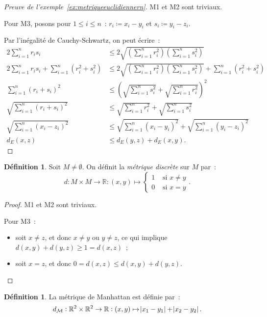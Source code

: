 \documentclass{report}
\theoremstyle{definition}
\newtheorem{déf}[thm]{Définition}
\theoremstyle{remark}
\newcommand{\R}{\mathbb R}
\begin{document}
		\begin{proof}[Preuve de l'exemple~\ref{ex:metriqueeuclidiennern}] M1 et M2 sont triviaux.

		Pour M3, posons pour $1 \leq i \leq n$~: $r_i \coloneqq x_i - y_i$ et $s_i \coloneqq y_i - z_i$.

		Par l'inégalité de Cauchy-Schwartz, on peut écrire~:
		\begin{align*}
			2\sum_{i=1}^nr_is_i &\leq 2\sqrt {\left(\sum_{i=1}^nr_i^2\right)\left(\sum_{i=1}^ns_i^2\right)} \\
			2\sum_{i=1}^nr_is_i + \sum_{i=1}^n(r_i^2+s_i^2) &\leq 2\sqrt{\left(\sum_{i=1}^nr_i^2\right)\left(\sum_{i=1}^ns_i^2\right)} + \sum_{i=1}^n(r_i^2+s_i^2) \\
			\sum_{i=1}^n(r_i+s_i)^2 &\leq \left(\sqrt {\sum_{i=1}^ns_i^2} + \sqrt {\sum_{i=1}^nr_i^2}\right)^2 \\
			\sqrt {\sum_{i=1}^n(r_i+s_i)^2} &\leq \sqrt {\sum_{i=1}^nr_i^2} + \sqrt {\sum_{i=1}^ns_i^2} \\
			\sqrt {\sum_{i=1}^n(x_i-z_i)^2} &\leq \sqrt {\sum_{i=1}^n(x_i-y_i)^2} + \sqrt {\sum_{i=1}^n(y_i-z_i)^2} \\
			d_E(x, z) &\leq d_E(y, z) + d_E(x, y).
		\end{align*}
		\end{proof}

		\begin{déf} Soit $M \neq \emptyset$. On définit la \textit{métrique discrète} sur $M$ par~:
		\[d : M \times M \to \R : (x, y) \mapsto \begin{cases} 1 &\text{ si } x \neq y \\ 0 &\text{ si } x = y \end{cases}.\]
		\end{déf}

		\begin{proof} M1 et M2 sont triviaux.

		Pour M3~:
		\begin{itemize}
			\item soit $x \neq z$, et donc $x \neq y$ ou $y \neq z$, ce qui implique $d(x, y) + d(y, z) \geq 1 = d(x, z)$~;
			\item soit $x = z$, et donc $0 = d(x, z) \leq d(x, y) + d(y, z)$.
		\end{itemize}
		\end{proof}

		\begin{déf} La métrique de Manhattan est définie par~:
		\[d_{\mathcal M} : \R^2 \times \R^2 \to \R : (x, y) \mapsto \abs {x_1 - y_1} + \abs {x_2 - y_2}.\]
		\end{déf}
\end{document}
